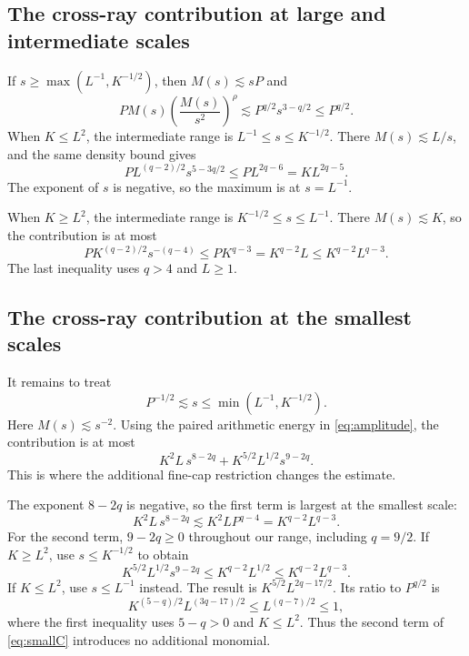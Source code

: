 \documentclass[11pt,reqno]{amsart}
\numberwithin{equation}{section}
\theoremstyle{definition}
\theoremstyle{remark}
\begin{document}
\subsection{The cross-ray contribution at large and intermediate scales}
If $s\ge\max(L^{-1},K^{-1/2})$, then $M(s)\lesssim sP$ and
\begin{equation}\label{eq:largeC}
 PM(s)\left(\frac{M(s)}{s^2}\right)^\rho
 \lesssim P^{q/2}s^{3-q/2}\le P^{q/2}.
\end{equation}
When $K\le L^2$, the intermediate range is $L^{-1}\le s\le K^{-1/2}$.
There $M(s)\lesssim L/s$, and the same density bound gives
\begin{equation}\label{eq:middleC1}
 PL^{(q-2)/2}s^{5-3q/2}\le PL^{2q-6}=KL^{2q-5}.
\end{equation}
The exponent of $s$ is negative, so the maximum is at $s=L^{-1}$.

When $K\ge L^2$, the intermediate range is $K^{-1/2}\le s\le L^{-1}$.
There $M(s)\lesssim K$, so the contribution is at most
\begin{equation}\label{eq:middleC2}
 PK^{(q-2)/2}s^{-(q-4)}
 \le PK^{q-3}=K^{q-2}L\le K^{q-2}L^{q-3}.
\end{equation}
The last inequality uses $q>4$ and $L\ge1$.

\subsection{The cross-ray contribution at the smallest scales}
It remains to treat
\begin{equation}\label{eq:smallscales}
 P^{-1/2}\lesssim s\le\min(L^{-1},K^{-1/2}).
\end{equation}
Here $M(s)\lesssim s^{-2}$.
Using the paired arithmetic energy in \eqref{eq:amplitude}, the contribution is at most
\begin{equation}\label{eq:smallC}
 K^2L\,s^{8-2q}+K^{5/2}L^{1/2}s^{9-2q}.
\end{equation}
This is where the additional fine-cap restriction changes the estimate.

The exponent $8-2q$ is negative, so the first term is largest at the smallest scale:
\begin{equation}\label{eq:newthird}
 K^2L\,s^{8-2q}\lesssim K^2L P^{q-4}
 =K^{q-2}L^{q-3}.
\end{equation}
For the second term, $9-2q\ge0$ throughout our range, including $q=9/2$.
If $K\ge L^2$, use $s\le K^{-1/2}$ to obtain
\begin{equation}\label{eq:smallC2a}
 K^{5/2}L^{1/2}s^{9-2q}
 \le K^{q-2}L^{1/2}\le K^{q-2}L^{q-3}.
\end{equation}
If $K\le L^2$, use $s\le L^{-1}$ instead. The result is
$K^{5/2}L^{2q-17/2}$.
Its ratio to $P^{q/2}$ is
\begin{equation}\label{eq:smallC2b}
 K^{(5-q)/2}L^{(3q-17)/2}
 \le L^{(q-7)/2}\le1,
\end{equation}
where the first inequality uses $5-q>0$ and $K\le L^2$.
Thus the second term of \eqref{eq:smallC} introduces no additional monomial.
\end{document}
